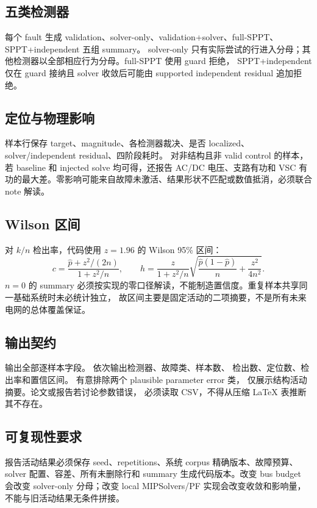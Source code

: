 \subsection{五类检测器}

每个 fault 生成 validation、solver-only、validation+solver、full-SPPT、SPPT+independent 五组 summary。
solver-only 只有实际尝试的行进入分母；其他检测器以全部相应行为分母。full-SPPT 使用 guard 拒绝，
SPPT+independent 仅在 guard 接纳且 solver 收敛后可能由 supported independent residual 追加拒绝。

\subsection{定位与物理影响}

样本行保存 target、magnitude、各检测器裁决、是否 localized、solver/independent residual、四阶段耗时。
对非结构且非 valid control 的样本，若 baseline 和 injected solve 均可得，还报告 AC/DC 电压、支路有功和 VSC
有功的最大差。零影响可能来自故障未激活、结果形状不匹配或数值抵消，必须联合 note 解读。

\subsection{Wilson 区间}

对 $k/n$ 检出率，代码使用 $z=1.96$ 的 Wilson 95\% 区间：
\begin{equation}
c=\frac{\hat p+z^2/(2n)}{1+z^2/n},\qquad
h=\frac{z}{1+z^2/n}\sqrt{\frac{\hat p(1-\hat p)}{n}+\frac{z^2}{4n^2}}.
\end{equation}
$n=0$ 的 summary 必须按实现的零口径解读，不能制造置信度。重复样本共享同一基础系统时未必统计独立，
故区间主要是固定活动的二项摘要，不是所有未来电网的总体覆盖保证。

\subsection{输出契约}

 输出全部逐样本字段。 依次输出检测器、故障类、样本数、
检出数、定位数、检出率和置信区间。 有意排除两个 plausible parameter error 类，
仅展示结构活动摘要。论文或报告若讨论参数错误，
必须读取 CSV，不得从压缩 LaTeX 表推断其不存在。

\subsection{可复现性要求}

报告活动结果必须保存 seed、repetitions、系统 corpus 精确版本、故障预算、solver 配置、容差、所有未删除行和
summary 生成代码版本。改变 bus budget 会改变 solver-only 分母；改变 local MIPSolvers/PF 实现会改变收敛和影响量，
不能与旧活动结果无条件拼接。
